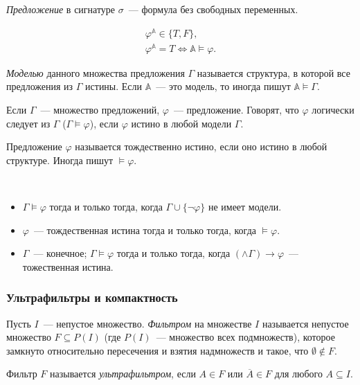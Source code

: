 \begin{definition}
    \textit{Предложение} в сигнатуре $\sigma$~— формула без свободных переменных.  

    \begin{equation*}
        \begin{aligned}
            \varphi^{\mathbb{A}} \in \{T, F\}, \\ 
            \varphi^{\mathbb{A}} = T \Longleftrightarrow \mathbb{A} \models \varphi.
        \end{aligned}
    \end{equation*}
\end{definition}

\begin{definition} 
    \textit{Моделью} данного множества предложения $\Gamma$ называется структура, в которой все предложения из $\Gamma$ истины. Если $\mathbb{A}$~— это модель, то иногда пишут $\mathbb{A} \models \Gamma$. 

    Если $\Gamma$~— множество предложений, $\varphi$~— предложение. Говорят, что $\varphi$ логически следует из $\Gamma$ ($\Gamma \models \varphi$), если $\varphi$ истино в любой модели $\Gamma$. 
\end{definition} 

\begin{definition}
    Предложение $\varphi$ называется тождественно истино, если оно истино в любой структуре. Иногда пишут $\models \varphi$. 
\end{definition}

\begin{stat} \ 
    \begin{itemize}
        \item $\Gamma \models \varphi$ тогда и только тогда, когда $\Gamma \cup \{\neg \varphi\}$ не имеет модели. 
        \item $\varphi$~— тождественная истина тогда и только тогда, когда $\models \varphi$. 
        \item $\Gamma$~— конечное; $\Gamma \models \varphi$ тогда и только тогда, когда $(\wedge \Gamma) \to \varphi$~— тожественная истина.
    \end{itemize}
\end{stat} 

\subsubsection{Ультрафильтры и компактность} 

\begin{definition}
    Пусть $I$~— непустое множество. \textit{Фильтром} на множестве $I$ называется непустое множество $F \subseteq P(I)$ (где $P(I)$~— множество всех подмножеств), которое замкнуто относительно пересечения и взятия надмножеств и такое, что $\emptyset \notin F$.  

    Фильтр $F$ называется \textit{ультрафильтром}, если $A \in F$ или $\overline{A} \in F$ для любого $A \subseteq I$. 
\end{definition} 

